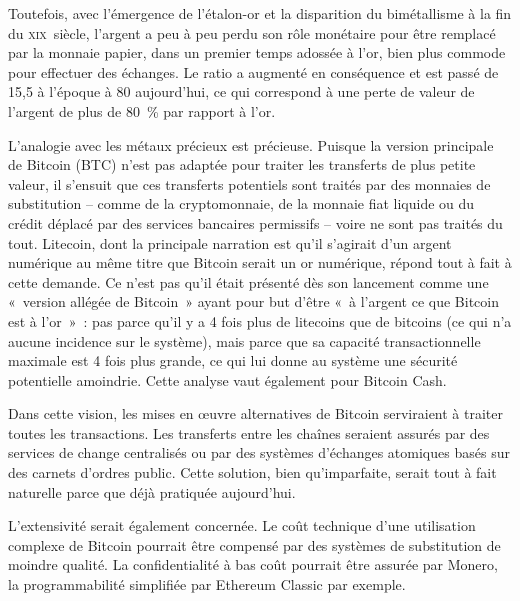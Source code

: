 Toutefois, avec l'émergence de l'étalon-or et la disparition du bimétallisme à la fin du \textsc{xix}\ieme{}~siècle, l'argent a peu à peu perdu son rôle monétaire pour être remplacé par la monnaie papier, dans un premier temps adossée à l'or, bien plus commode pour effectuer des échanges. Le ratio a augmenté en conséquence et est passé de 15,5 à l'époque à 80 aujourd'hui, ce qui correspond à une perte de valeur de l'argent de plus de 80~\% par rapport à l'or.

L'analogie avec les métaux précieux est précieuse. Puisque la version principale de Bitcoin (BTC) n'est pas adaptée pour traiter les transferts de plus petite valeur, il s'ensuit que ces transferts potentiels sont traités par des monnaies de substitution -- comme de la cryptomonnaie, de la monnaie fiat liquide ou du crédit déplacé par des services bancaires permissifs -- voire ne sont pas traités du tout. Litecoin, dont la principale narration est qu'il s'agirait d'un argent numérique au même titre que Bitcoin serait un or numérique, répond tout à fait à cette demande. Ce n'est pas qu'il était présenté dès son lancement comme une «~version allégée de Bitcoin~» ayant pour but d'être «~à l'argent ce que Bitcoin est à l'or~»~: pas parce qu'il y a 4 fois plus de litecoins que de bitcoins (ce qui n'a aucune incidence sur le système), mais parce que sa capacité transactionnelle maximale est 4 fois plus grande, ce qui lui donne au système une sécurité potentielle amoindrie. Cette analyse vaut également pour Bitcoin Cash.

Dans cette vision, les mises en œuvre alternatives de Bitcoin serviraient à traiter toutes les transactions. Les transferts entre les chaînes seraient assurés par des services de change centralisés ou par des systèmes d'échanges atomiques basés sur des carnets d'ordres public. Cette solution, bien qu'imparfaite, serait tout à fait naturelle parce que déjà pratiquée aujourd'hui.

L'extensivité serait également concernée. Le coût technique d'une utilisation complexe de Bitcoin pourrait être compensé par des systèmes de substitution de moindre qualité. La confidentialité à bas coût pourrait être assurée par Monero, la programmabilité simplifiée par Ethereum Classic par exemple.

